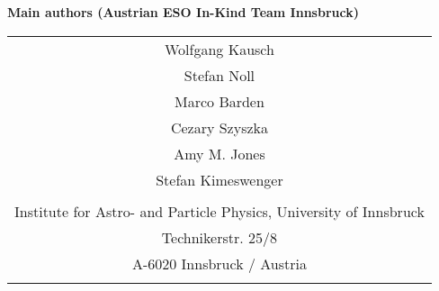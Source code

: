 \documentclass[a4paper,twoside,11pt]{article}
\begin{document}

\begin{center}
\textbf{Main authors (Austrian ESO In-Kind Team Innsbruck)}
  \tablehead{
    \hline}
  \tabletail{\hline}

  \begin{supertabular}{|c|}
    \\
    Wolfgang Kausch \\
    Stefan Noll \\
    Marco Barden \\
    Cezary Szyszka \\
    Amy M. Jones \\
    Stefan Kimeswenger \\
    \\
    Institute for Astro- and Particle Physics,
    University of Innsbruck \\
    Technikerstr. 25/8 \\
    A-6020 Innsbruck / Austria \\
    \\
  \end{supertabular}
\end{center}


\tableofcontents
\cleardoublepage

\cleardoublepage

\cleardoublepage

\cleardoublepage

\cleardoublepage

\cleardoublepage

\end{document}
